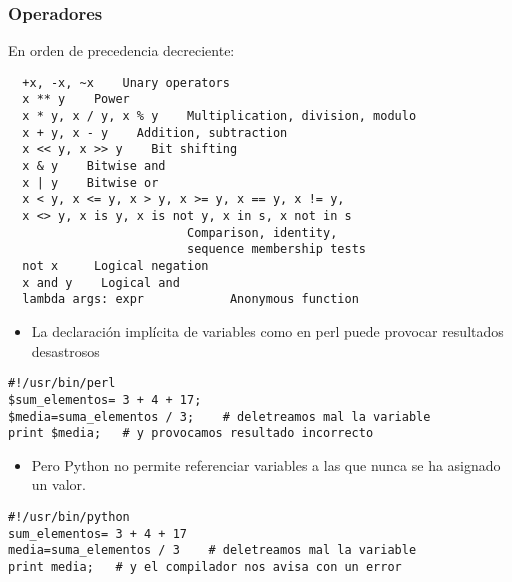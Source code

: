 \begin{frame}[fragile]
  \begin{center}
\frametitle{Operadores }
En orden de precedencia decreciente:
  \end{center}
  

  \begin{footnotesize}
\begin{verbatim}
  +x, -x, ~x    Unary operators
  x ** y    Power 
  x * y, x / y, x % y    Multiplication, division, modulo
  x + y, x - y    Addition, subtraction
  x << y, x >> y    Bit shifting
  x & y    Bitwise and
  x | y    Bitwise or
  x < y, x <= y, x > y, x >= y, x == y, x != y,
  x <> y, x is y, x is not y, x in s, x not in s  
                         Comparison, identity, 
                         sequence membership tests
  not x     Logical negation
  x and y    Logical and
  lambda args: expr            Anonymous function
\end{verbatim}
  \end{footnotesize}

\end{frame}

\begin{frame}[fragile]

\begin{itemize}
  
\item 
La declaración implícita de variables como en perl puede provocar resultados desastrosos
\end{itemize}

\begin{footnotesize}
\begin{verbatim}
#!/usr/bin/perl
$sum_elementos= 3 + 4 + 17;
$media=suma_elementos / 3;    # deletreamos mal la variable
print $media;   # y provocamos resultado incorrecto
\end{verbatim}
\end{footnotesize}

\begin{itemize}
\item 
Pero Python no permite referenciar variables a las que nunca se ha
asignado un valor.
\end{itemize}
\begin{footnotesize}
\begin{verbatim}
#!/usr/bin/python
sum_elementos= 3 + 4 + 17
media=suma_elementos / 3    # deletreamos mal la variable
print media;   # y el compilador nos avisa con un error
\end{verbatim}
\end{footnotesize}



\end{frame}


